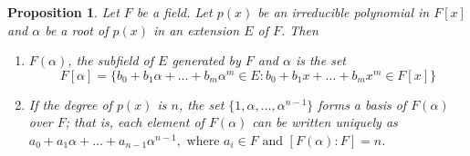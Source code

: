 \documentclass[draft]{article}
\newtheorem{prop}[thm]{Proposition}
\theoremstyle{definition}
\theoremstyle{remark}
\begin{document}
			\begin{prop}
				Let $F$ be a field. Let $p(x)$ be an irreducible polynomial in $F[x]$ and $\alpha$ be a root of $p(x)$ in an extension $E$ of $F$. Then
				\begin{enumerate}
				\renewcommand{\labelenumi}{(\roman{enumi})}
					\item $F(\alpha)$, the subfield of $E$ generated by $F$ and $\alpha$ is the set
					\begin{equation*}
					    F[\alpha] = \{b_0 + b_1\alpha + \dots + b_{m}\alpha^m \in E : b_0 + b_1x + \dots + b_{m}x^m \in F[x] \}
					\end{equation*}
					\item If the degree of $p(x)$ is $n$, the set $\{1, \alpha, \dots, \alpha^{n - 1}\}$ forms a basis of $F(\alpha)$ over $F$; that is, each element of $F(\alpha)$ can be written uniquely as\\$a_0 + a_1\alpha + \dots + a_{n - 1}\alpha^{n - 1}, \text{ where } a_i \in F \text{ and } [F(\alpha):F] = n$.
				\end{enumerate}
			\end{prop}
			
\end{document}

